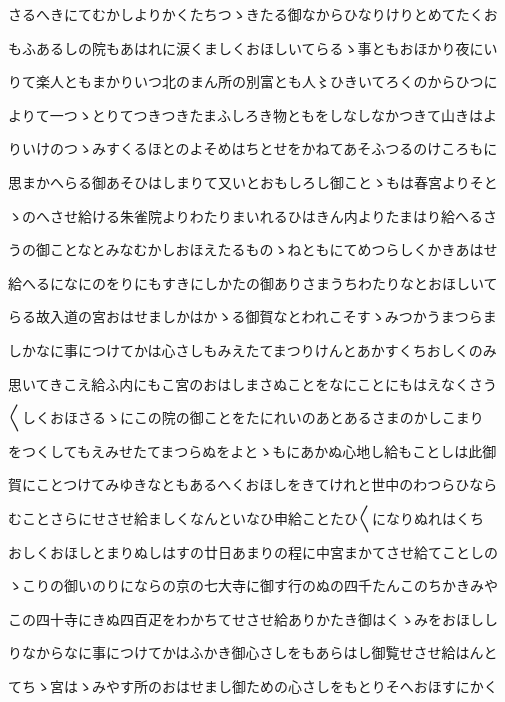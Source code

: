 \documentclass[a4paper,11pt,landscape]{ltjtarticle}
\begin{document}
さるへきにてむかしよりかくたちつゝきたる御なからひなりけりとめてたくお
\par\medskip
もふあるしの院もあはれに涙くましくおほしいてらるゝ事ともおほかり夜にい
\par\medskip
りて楽人ともまかりいつ北のまん所の別富とも人〻ひきいてろくのからひつに
\par\medskip
よりて一つゝとりてつきつきたまふしろき物ともをしなしなかつきて山きはよ
\par\medskip
りいけのつゝみすくるほとのよそめはちとせをかねてあそふつるのけころもに
\par\medskip
思まかへらる御あそひはしまりて又いとおもしろし御ことゝもは春宮よりそと
\par\medskip
ゝのへさせ給ける朱雀院よりわたりまいれるひはきん内よりたまはり給へるさ
\par\medskip
うの御ことなとみなむかしおほえたるものゝねともにてめつらしくかきあはせ
\par\medskip
給へるになにのをりにもすきにしかたの御ありさまうちわたりなとおほしいて
\par\medskip
らる故入道の宮おはせましかはかゝる御賀なとわれこそすゝみつかうまつらま
\par\medskip
しかなに事につけてかは心さしもみえたてまつりけんとあかすくちおしくのみ
\par\medskip
思いてきこえ給ふ内にもこ宮のおはしまさぬことをなにことにもはえなくさう
\par\medskip
〱しくおほさるゝにこの院の御ことをたにれいのあとあるさまのかしこまり
\par\medskip
をつくしてもえみせたてまつらぬをよとゝもにあかぬ心地し給もことしは此御
\par\medskip
賀にことつけてみゆきなともあるへくおほしをきてけれと世中のわつらひなら
\par\medskip
むことさらにせさせ給ましくなんといなひ申給ことたひ〱になりぬれはくち
\par\medskip
おしくおほしとまりぬしはすの廿日あまりの程に中宮まかてさせ給てことしの
\par\medskip
ゝこりの御いのりにならの京の七大寺に御す行のぬの四千たんこのちかきみや
\par\medskip
この四十寺にきぬ四百疋をわかちてせさせ給ありかたき御はくゝみをおほしし
\par\medskip
りなからなに事につけてかはふかき御心さしをもあらはし御覧せさせ給はんと
\par\medskip
てちゝ宮はゝみやす所のおはせまし御ための心さしをもとりそへおほすにかく
\par\medskip
\end{document}
